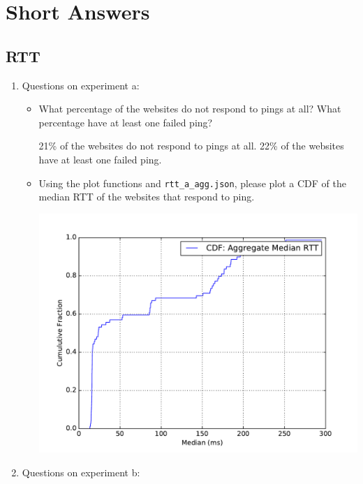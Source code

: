 \documentclass[10pt]{article}
\begin{document}
\section*{Short Answers}

\subsection*{RTT}

\begin{enumerate}
\item Questions on experiment a:

\begin{itemize}
\item What percentage of the websites do not respond to pings at all? What percentage have at least one failed ping?

21\% of the websites do not respond to pings at all. 22\% of the websites have at least one failed ping.

\item Using the plot functions and \texttt{rtt\_a\_agg.json}, please plot a CDF of the median RTT of the websites that respond to ping.

\begin{center}
\includegraphics[scale=0.5]{rtt_a}
\end{center}

\end{itemize}

\item Questions on experiment b:

\begin{itemize}


\end{itemize}
\end{enumerate}
\end{document}
